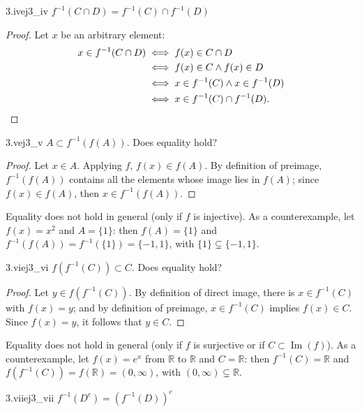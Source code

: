 \documentclass[11pt, a4paper]{article}
\begin{document}
\begin{proposicion}{3.iv}{ej3_iv}
$f^{-1}(C\cap D)=f^{-1}(C)\cap f^{-1}(D)$
\end{proposicion}

\begin{proof}
Let $x$ be an arbitrary element:
\begin{align*}
x \in f^{-1}(C \cap D) &\iff f(x) \in C \cap D \\
&\iff f(x) \in C \land f(x) \in D \\
&\iff x \in f^{-1}(C) \land x \in f^{-1}(D) \\
&\iff x \in f^{-1}(C) \cap f^{-1}(D). \qedhere
\end{align*}
\end{proof}

\begin{proposicion}{3.v}{ej3_v}
$A\subset f^{-1}(f(A))$. Does equality hold?
\end{proposicion}

\begin{proof}
Let $x \in A$. Applying $f$, $f(x) \in f(A)$. By definition of preimage, $f^{-1}(f(A))$ contains
all the elements whose image lies in $f(A)$; since $f(x) \in f(A)$, then $x \in f^{-1}(f(A))$.
\end{proof}

Equality does not hold in general (only if $f$ is injective). As a counterexample, let $f(x) = x^2$ and
$A = \{1\}$: then $f(A) = \{1\}$ and $f^{-1}(f(A)) = f^{-1}(\{1\}) = \{-1, 1\}$, with
$\{1\} \subsetneq \{-1, 1\}$.

\begin{proposicion}{3.vi}{ej3_vi}
$f(f^{-1}(C))\subset C$. Does equality hold?
\end{proposicion}

\begin{proof}
Let $y \in f(f^{-1}(C))$. By definition of direct image, there is $x \in f^{-1}(C)$ with $f(x) = y$;
and by definition of preimage, $x \in f^{-1}(C)$ implies $f(x) \in C$. Since $f(x) = y$, it follows that
$y \in C$.
\end{proof}

Equality does not hold in general (only if $f$ is surjective or if $C \subset \operatorname{Im}(f)$).
As a counterexample, let $f(x) = e^x$ from $\mathbb{R}$ to $\mathbb{R}$ and $C = \mathbb{R}$: then
$f^{-1}(C) = \mathbb{R}$ and $f(f^{-1}(C)) = f(\mathbb{R}) = (0, \infty)$, with
$(0, \infty) \subsetneq \mathbb{R}$.

\begin{proposicion}{3.vii}{ej3_vii}
$f^{-1}(D^c) = (f^{-1}(D))^c$
\end{proposicion}
\end{document}
